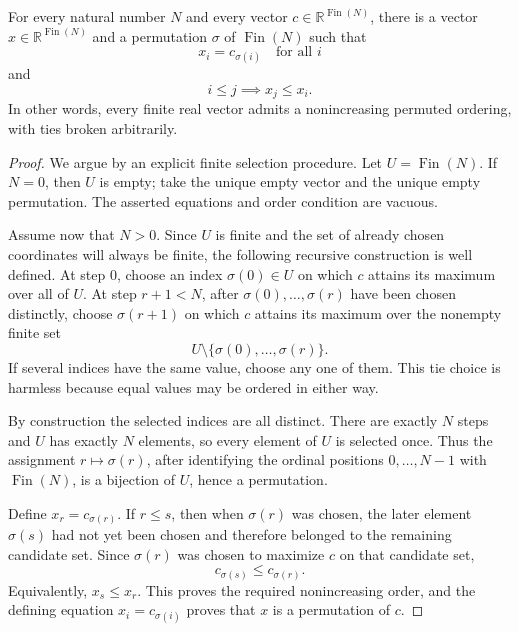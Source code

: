\begin{helper}
For every natural number \(N\) and every vector
\(c\in\mathbb R^{\operatorname{Fin}(N)}\), there is a vector
\(x\in\mathbb R^{\operatorname{Fin}(N)}\) and a permutation
\(\sigma\) of \(\operatorname{Fin}(N)\) such that
\[
x_i=c_{\sigma(i)}\quad\text{for all }i
\]
and
\[
i\le j\implies x_j\le x_i .
\]
In other words, every finite real vector admits a nonincreasing
permuted ordering, with ties broken arbitrarily.
\end{helper}
\begin{proof}
We argue by an explicit finite selection procedure.  Let
\(U=\operatorname{Fin}(N)\).  If \(N=0\), then \(U\) is empty; take the unique
empty vector and the unique empty permutation.  The asserted equations and
order condition are vacuous.

Assume now that \(N>0\).  Since \(U\) is finite and the set of already chosen
coordinates will always be finite, the following recursive construction is
well defined.  At step \(0\), choose an index \(\sigma(0)\in U\) on which
\(c\) attains its maximum over all of \(U\).  At step \(r+1<N\), after
\(\sigma(0),\ldots,\sigma(r)\) have been chosen distinctly, choose
\(\sigma(r+1)\) on which \(c\) attains its maximum over the nonempty finite
set
\[
U\setminus\{\sigma(0),\ldots,\sigma(r)\}.
\]
If several indices have the same value, choose any one of them.  This tie
choice is harmless because equal values may be ordered in either way.

By construction the selected indices are all distinct.  There are exactly
\(N\) steps and \(U\) has exactly \(N\) elements, so every element of \(U\) is
selected once.  Thus the assignment \(r\mapsto \sigma(r)\), after identifying
the ordinal positions \(0,\ldots,N-1\) with \(\operatorname{Fin}(N)\), is a
bijection of \(U\), hence a permutation.

Define \(x_r=c_{\sigma(r)}\).  If \(r\le s\), then when \(\sigma(r)\) was
chosen, the later element \(\sigma(s)\) had not yet been chosen and therefore
belonged to the remaining candidate set.  Since \(\sigma(r)\) was chosen to
maximize \(c\) on that candidate set,
\[
c_{\sigma(s)}\le c_{\sigma(r)}.
\]
Equivalently, \(x_s\le x_r\).  This proves the required nonincreasing order,
and the defining equation \(x_i=c_{\sigma(i)}\) proves that \(x\) is a
permutation of \(c\).
\end{proof}
